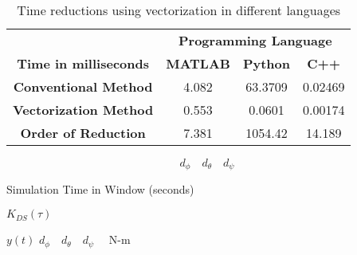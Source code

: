 \documentclass[16pt]{article}
\begin{document}
\begin{table}
\parbox{0.65\textwidth}{\caption{Time reductions using vectorization in different languages}\label{Tab:vect}}

\begin{tabular}{|c|c|c|c|}
\hline
         & \multicolumn{3}{c|}{\textbf{Programming Language}}\\\cline{2-4} 
\textbf{Time in milliseconds} &   \textbf{MATLAB}   &  \textbf{Python} &   \textbf{C++} \\ \hline
\textbf{Conventional Method}  & 4.082 & 63.3709 & 0.02469    \\
\textbf{Vectorization Method} & 0.553 & 0.0601  & 0.00174    \\
\textbf{Order of Reduction}   & 7.381 & 1054.42 & 14.189     \\
\hline
\end{tabular}
\end{table}


\begin{equation}
d_\phi \quad d_\theta \quad d_\psi
\end{equation}

Simulation Time in Window (seconds)

$K_{DS}(\tau)$


$y(t)$ 
$d_\phi \quad  d_\theta \quad d_\psi \quad$ N-m
\end{document}
